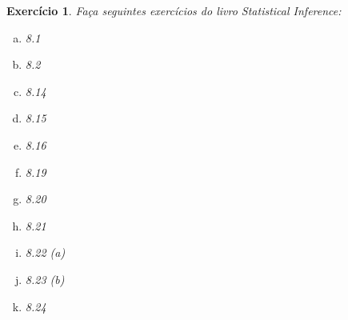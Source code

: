 \documentclass[letter,11pt]{article}
\newtheorem{exer}{Exercício}
\begin{document}
\begin{exer} \rm
 Faça seguintes exercícios do livro Statistical Inference: 

\begin{enumerate}[a)] 

\item 8.1 

\item 8.2

% 
% 
% 
% 
% 

\item 8.14

\item 8.15

\item 8.16
% 
% 
% 
\item 8.19

\item 8.20

\item 8.21

\item 8.22 (a)

\item 8.23 (b)

\item 8.24

\end{enumerate}
\end{exer}
\end{document}

